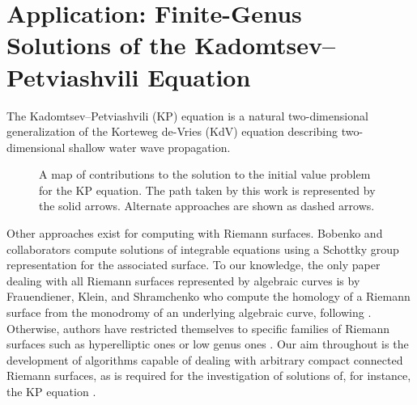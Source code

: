 \chapter{Application: Finite-Genus Solutions of the Kadomtsev--Petviashvili
  Equation}\label{ch:kp}

The Kadomtsev--Petviashvili (KP) equation is a natural two-dimensional
generalization of the Korteweg de-Vries (KdV) equation describing
two-dimensional shallow water wave propagation.

\begin{figure}
  \centering
  \caption{A map of contributions to the solution to the initial value problem
    for the KP equation. The path taken by this work is represented by the solid
    arrows. Alternate approaches are shown as dashed arrows.}
\end{figure}


Other approaches exist for computing with Riemann surfaces. Bobenko and
collaborators \cite{belokolos, BobenkoBordag89} compute solutions of integrable
equations using a Schottky group representation for the associated surface. To
our knowledge, the only paper dealing with all Riemann surfaces represented by
algebraic curves is by Frauendiener, Klein, and Shramchenko who compute the
homology of a Riemann surface from the monodromy of an underlying algebraic
curve, following \cite{dvh1}. Otherwise, authors have restricted themselves to
specific families of Riemann surfaces such as hyperelliptic ones
\cite{FrauendienerKlein06,FrauendienerKlein15} or low genus ones
\cite{DFS97,FinkelSegur85,DeconinckSwierczewski13}. Our aim throughout is the
development of algorithms capable of dealing with arbitrary compact connected
Riemann surfaces, as is required for the investigation of solutions of, for
instance, the KP equation \cite{DS98,Shiota86}.



